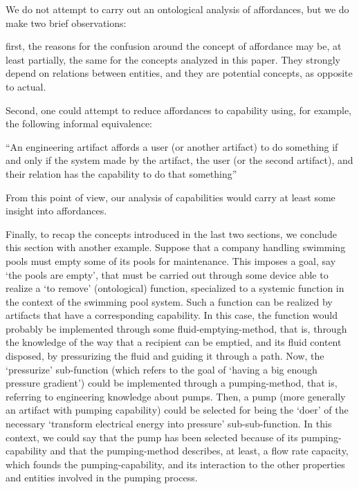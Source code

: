 \documentclass[sw]{iosart2x}
\newcommand{\bflist}{\begin{list}{}{\setlength{\topsep}{2mm}\setlength{\partopsep}{0mm}\setlength{\parsep}{0mm}\setlength{\leftmargin}{9mm}\setlength{\labelwidth}{8mm}}}
\newcommand{\eflist}{\end{list}}
\newcommand{\ExLabel}{\textrm{ex}}
\newcommand{\myex}[1]{\refstepcounter{cntex}\begin{small}{\bf \ExLabel\thecntex\label{ex:#1}}\end{small}}
\newcounter{cntex}
\newcommand{\mytext}[1]{``#1''}
\newcommand{\myComment}[1]{{\unskip \ignorespaces}}
\begin{document}
We do not attempt to carry out an ontological analysis of affordances, but we do make two brief observations:
\begin{itemize}
  \item first, the reasons for the confusion around the concept of affordance may be, at least partially, the same for the concepts analyzed in this paper. They strongly depend on relations between entities, and they are potential concepts, as opposite to actual.
  \item Second, one could attempt to reduce affordances to capability using, for example, the following informal equivalence:
  \bflist
    \item[\myex{affordances}] \mytext{An engineering artifact affords a user (or another artifact) to do something if and only if the system made by the artifact, the user (or the second artifact), and their relation has the capability to do that something}
  \eflist 
\end{itemize}
From this point of view, our analysis of capabilities would carry at least some insight into affordances.

Finally, to recap the concepts introduced in the last two sections, we conclude this section with another example.\myComment{\footnote{Notice again the similarity with the work of Kitamura, Sasajima, Mizoguchi et al. \cite{kitamuraOntologybasedDescriptionFunctional2003}.}} Suppose that a company handling swimming pools must empty some of its pools for maintenance. This imposes a goal, say `the pools are empty', that must be carried out through some device able to realize a `to remove' (ontological) function, specialized to a systemic function in the context of the swimming pool system.
Such a function can be realized by artifacts that have a corresponding capability. In this case, the function would probably be implemented through some fluid-emptying-method, that is, through the knowledge of the way that a recipient can be emptied, and its fluid content disposed, by pressurizing the fluid and guiding it through a path.
Now, the `pressurize' sub-function (which refers to the goal of `having a big enough pressure gradient') could be implemented through a pumping-method, that is, referring to engineering knowledge about pumps.
Then, a pump (more generally an artifact with pumping capability) could be selected for being the `doer' of the necessary `transform electrical energy into pressure' sub-sub-function.
In this context, we could say that the pump has been selected because of its pumping-capability and that the pumping-method describes, at least, a flow rate capacity, which founds the pumping-capability, and its interaction to the other properties and entities involved in the pumping process. 
\end{document}
